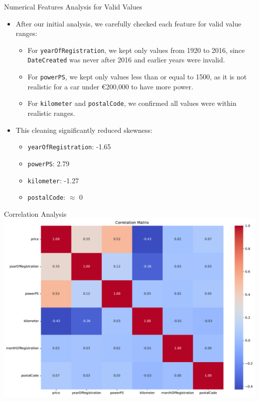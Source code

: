 \documentclass{beamer}
\begin{document}
\begin{frame}{Numerical Features Analysis for Valid Values}
        \begin{itemize}
                \item After our initial analysis, we carefully checked each feature for valid value ranges:
                        \begin{itemize}
                                \item For \texttt{yearOfRegistration}, we kept
                                        only values from 1920 to 2016, since
                                        \texttt{DateCreated} was never after
                                        2016 and earlier years were invalid.
                                \item For \texttt{powerPS}, we kept only values
                                        less than or equal to 1500, as it is
                                        not realistic for a car under €200,000
                                        to have more power.
                                \item For \texttt{kilometer} and
                                        \texttt{postalCode}, we confirmed all
                                        values were within realistic ranges.
                        \end{itemize}
                \item This cleaning significantly reduced skewness:
                        \begin{itemize}
                                \item \texttt{yearOfRegistration}: -1.65
                                \item \texttt{powerPS}: 2.79
                                \item \texttt{kilometer}: -1.27
                                \item \texttt{postalCode}: $\approx$ 0
                        \end{itemize}
        \end{itemize}
\end{frame}

\begin{frame}{Correlation Analysis}
        \includegraphics[scale=0.35]{heatmap.pdf}
\end{frame}
\end{document}

